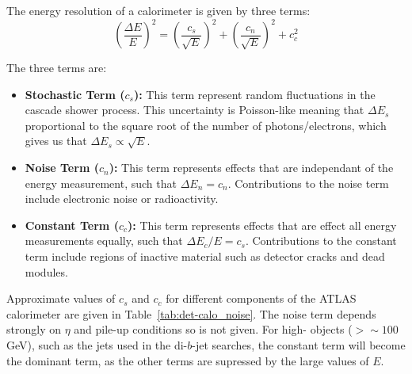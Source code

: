 The energy resolution of a calorimeter is given by three terms:
\begin{equation}
  \left(\frac{\Delta E}{E}\right)^2 = \left(\frac{c_s}{\sqrt{E}}\right)^2 + \left(\frac{c_n}{\sqrt{E}}\right)^2 + c_c^2
\end{equation}

\noindent
The three terms are:
\begin{itemize}[leftmargin=*]
\item\textbf{Stochastic Term ($c_s$):}
  This term represent random fluctuations in the cascade shower process.
  This uncertainty is Poisson-like meaning that $\Delta E_s$ proportional to the square root of the number of photons/electrons,
  which gives us that $\Delta E_s \propto \sqrt{E}$. \vspace{0.5em}
\item\textbf{Noise Term ($c_n$):}
  This term represents effects that are independant of the energy measurement, such that $\Delta E_n = c_n$.
  Contributions to the noise term include electronic noise or radioactivity. \vspace{0.5em}
\item\textbf{Constant Term ($c_c$):}
  This term represents effects that are effect all energy measurements equally, such that $\Delta E_c/E = c_s$.
  Contributions to the constant term include regions of inactive material such as detector cracks and dead modules.
\end{itemize}

Approximate values of $c_s$ and $c_c$ for different components of the ATLAS calorimeter are given in Table~\ref{tab:det-calo_noise}.
The noise term depends strongly on $\eta$ and pile-up conditions so is not given.
For high-\pT{} objects ($\gt \sim 100$ GeV), such as the jets used in the di-$b$-jet searches, the constant term will become the dominant term,
as the other terms are supressed by the large values of $E$.

